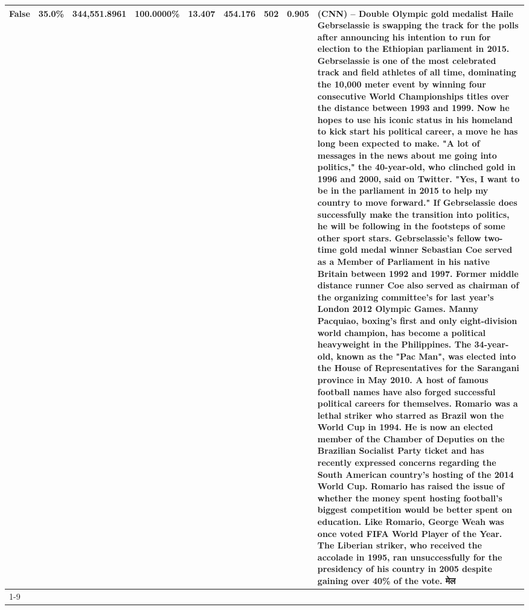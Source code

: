 \begin{table}[H]
{\begin{tabular}{lllrlllll}
False & 35.0\% & 344,551.8961 & \bfseries \color{red} 100.0000\% & 13.407 & 454.176 & 502 & 0.905 & (CNN) -- Double Olympic gold medalist Haile Gebrselassie is swapping the track for the polls after announcing his intention to run for election to the Ethiopian parliament in 2015. Gebrselassie is one of the most celebrated track and field athletes of all time, dominating the 10,000 meter event by winning four consecutive World Championships titles over the distance between 1993 and 1999. Now he hopes to use his iconic status in his homeland to kick start his political career, a move he has long been expected to make. "A lot of messages in the news about me going into politics," the 40-year-old, who clinched gold in 1996 and 2000, said on Twitter. "Yes, I want to be in the parliament in 2015 to help my country to move forward." If Gebrselassie does successfully make the transition into politics, he will be following in the footsteps of some other sport stars. Gebrselassie's fellow two-time gold medal winner Sebastian Coe served as a Member of Parliament in his native Britain between 1992 and 1997. Former middle distance runner Coe also served as chairman of the organizing committee's for last year's London 2012 Olympic Games. Manny Pacquiao, boxing's first and only eight-division world champion, has become a political heavyweight in the Philippines. The 34-year-old, known as the "Pac Man", was elected into the House of Representatives for the Sarangani province in May 2010. A host of famous football names have also forged successful political careers for themselves. Romario was a lethal striker who starred as Brazil won the World Cup in 1994. He is now an elected member of the Chamber of Deputies on the Brazilian Socialist Party ticket and has recently expressed concerns regarding the South American country's hosting of the 2014 World Cup. Romario has raised the issue of whether the money spent hosting football's biggest competition would be better spent on education. Like Romario, George Weah was once voted FIFA World Player of the Year. The Liberian striker, who received the accolade in 1995, ran unsuccessfully for the presidency of his country in 2005 despite gaining over 40\% of the vote. मेल \\
\cline{1-9}

\end{tabular}}
\end{table}

